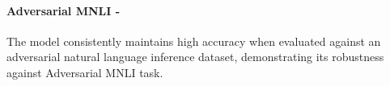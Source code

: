 \paragraph{Adversarial MNLI - \low} The model consistently maintains high accuracy when evaluated against an adversarial natural language inference dataset, demonstrating its robustness against Adversarial MNLI task. 
